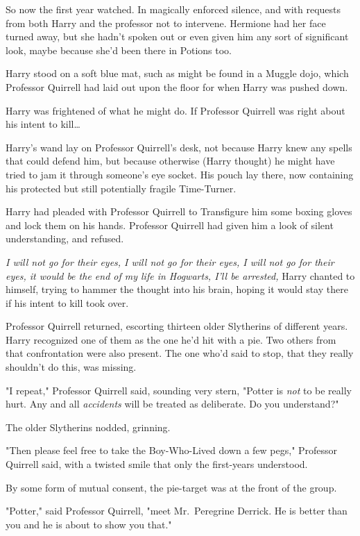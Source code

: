 So now the first year watched. In magically enforced silence, and with requests 
from both Harry and the professor not to intervene. Hermione had her face 
turned away, but she hadn't spoken out or even given him any sort of 
significant look, maybe because she'd been there in Potions too.

Harry stood on a soft blue mat, such as might be found in a Muggle dojo, which 
Professor Quirrell had laid out upon the floor for when Harry was pushed down.

Harry was frightened of what he might do. If Professor Quirrell was right about 
his intent to kill{\ldots}

Harry's wand lay on Professor Quirrell's desk, not because Harry knew any 
spells that could defend him, but because otherwise (Harry thought) he might 
have tried to jam it through someone's eye socket. His pouch lay there, now 
containing his protected but still potentially fragile Time-Turner.

Harry had pleaded with Professor Quirrell to Transfigure him some boxing gloves 
and lock them on his hands. Professor Quirrell had given him a look of silent 
understanding, and refused.

\emph{I will not go for their eyes, I will not go for their eyes, I will not go 
for their eyes, it would be the end of my life in Hogwarts, I'll be arrested,} 
Harry chanted to himself, trying to hammer the thought into his brain, hoping 
it would stay there if his intent to kill took over.

Professor Quirrell returned, escorting thirteen older Slytherins of different 
years. Harry recognized one of them as the one he'd hit with a pie. Two others 
from that confrontation were also present. The one who'd said to stop, that 
they really shouldn't do this, was missing.

"I repeat," Professor Quirrell said, sounding very stern, "Potter is \emph{not} 
to be really hurt. Any and all \emph{accidents} will be treated as deliberate. 
Do you understand?"

The older Slytherins nodded, grinning.

"Then please feel free to take the Boy-Who-Lived down a few pegs," Professor 
Quirrell said, with a twisted smile that only the first-years understood.

By some form of mutual consent, the pie-target was at the front of the group.

"Potter," said Professor Quirrell, "meet Mr.~Peregrine Derrick. He is better 
than you and he is about to show you that."

